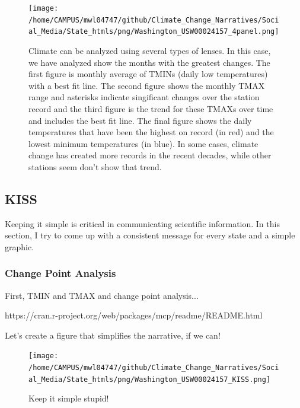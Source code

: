 \documentclass{article}
\begin{document}
\begin{figure}
\texttt{[image: /home/CAMPUS/mwl04747/github/Climate\_Change\_Narratives/Social\_Media/State\_htmls/png/Washington\_USW00024157\_4panel.png]}
\caption{Climate can be analyzed using several types of lenses. In this case, we have analyzed show the months with the greatest changes. The first figure is monthly average of TMINs (daily low temperatures) with a best fit line. The second figure shows the monthly TMAX range and asterisks indicate singificant changes over the station record and the third figure is the trend for these TMAXs over time and includes the best fit line. The final figure shows the daily temperatures that have been the highest on record (in red) and the lowest minimum temperatures (in blue). In some cases, climate change has created more records in the recent decades, while other stations seem don't show that trend.}
\label{fig:4panel}
\end{figure}

\subsection{KISS}

Keeping it simple is critical in communicating scientific information. In this section, I try to come up with a consistent message for every state and a simple graphic. 

\subsubsection{Change Point Analysis}
First, TMIN and TMAX and change point analysis...

https://cran.r-project.org/web/packages/mcp/readme/README.html



Let's create a figure that simplifies the narrative, if we can!

\begin{knitrout}
\color{fgcolor}\begin{kframe}


{\ttfamily\noindent\bfseries\color{errorcolor}{\#\# Error in seq(min(GSOM\$Year), max(GSOM\$Year), by = 2): object 'GSOM' not found}}\end{kframe}
\end{knitrout}

\begin{figure}
\texttt{[image: /home/CAMPUS/mwl04747/github/Climate\_Change\_Narratives/Social\_Media/State\_htmls/png/Washington\_USW00024157\_KISS.png]}
\caption{Keep it simple stupid!}
\label{fig:GSOM-KISS}
\end{figure}
\end{document}
